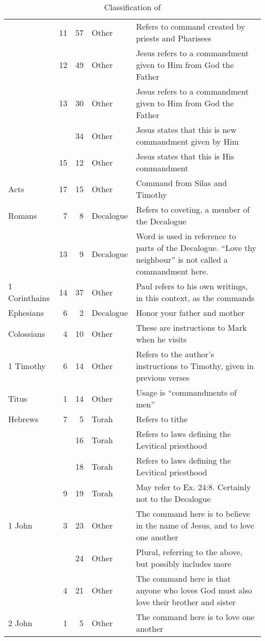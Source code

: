 \documentclass{article}
\newcommand{\entole}{\textepsilon\textnu\texttau\textomikron\textlambda\textepsilon\xspace}
\begin{document}
\begin{table}
\begin{tabularx}{\textwidth+40pt}{@{}lrrlX@{}}
    &11&57 & Other & Refers to command created by priests and Pharisees\\
    &12&49 & Other & Jesus refers to a commandment given to Him from God the Father\\
    &13&30 & Other & Jesus refers to a commandment given to Him from God the Father\\
    & &34 & Other & Jesus states that this is new commandment given by Him\\
    &15&12 & Other & Jesus states that this is His commandment\\
    Acts&17&15 & Other & Command from Silas and Timothy\\
    Romans&7&8 & Decalogue & Refers to coveting, a member of the Decalogue\\
    &13&9 & Decalogue & Word is used in reference to parts of the Decalogue.  ``Love thy neighbour'' is not called a commandment here.\\
    1 Corinthains&14&37 & Other & Paul refers to his own writings, in this context, as the commands\\
    Ephesians &6&2 & Decalogue & Honor your father and mother\\
    Colossians&4&10 & Other & These are instructions to Mark when he visits\\
    1 Timothy &6&14 & Other & Refers to the author's instructions to Timothy, given in previous verses\\
    Titus&1&14 & Other & Usage is ``commandments of men''\\
    Hebrews&7&5 & Torah & Refers to tithe\\
    & &16 & Torah & Refers to laws defining the Levitical priesthood\\
    & &18 & Torah & Refers to laws defining the Levitical priesthood\\
    &9&19 & Torah & May refer to Ex. 24:8.  Certainly not to the Decalogue\\
    1 John&3&23 & Other & The command here is to believe in the name of Jesus, and to love one another\\
    & &24 & Other & Plural, referring to the above, but possibly includes more\\
    &4&21 & Other & The command here is that anyone who loves God must also love their brother and sister\\
    2 John&1&5 & Other & The command here is to love one another\\
    \bottomrule
\end{tabularx}
    \caption{Classification of \entole}
    \label{training}
\end{table}
\end{document}
